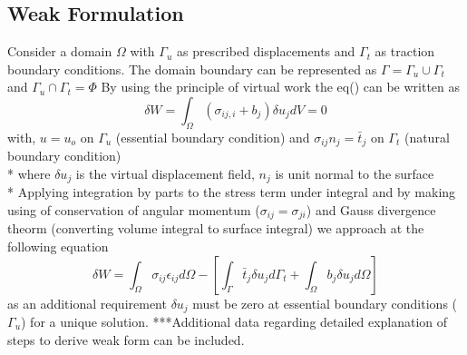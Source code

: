 \documentclass[12pt]{article}
\begin{document}
\subsection{Weak Formulation}
Consider a domain $\Omega$ with $\Gamma_u$ as prescribed displacements and $\Gamma_t$ as traction boundary conditions. The domain boundary can be represented as $\Gamma = \Gamma_u \cup \Gamma_t$ and $\Gamma_u \cap \Gamma_t = \Phi$
By using the principle of virtual work the eq() can be written as
\begin{equation}
\delta W = \int_\Omega (\sigma_{ij,i} + b_j ) \delta u_j dV = 0
\end{equation} 
with,
$u = u_o$ on $\Gamma_u$ (essential boundary condition) and
$\sigma_{ij}n_j = \bar{t}_j$ on $\Gamma_t$ (natural boundary condition) \\*
where $\delta u_j$ is the virtual displacement field, $n_j$ is unit normal to the surface \\*
Applying integration by parts to the stress term under integral and by making using of conservation of angular momentum ($ \sigma_{ij} = \sigma_{ji} $) and Gauss divergence theorm (converting volume integral to surface integral) we approach at the following equation
\begin{equation} \label{FinalWeakform}
\delta W = \int_{\Omega} \sigma_{ij} \epsilon_{ij} d\Omega - \left[ \int_{\Gamma} \bar{t}_j \delta u_j d\Gamma_t  + \int_{\Omega} b_j \delta u_j d\Omega \right]
\end{equation}
as an additional requirement $\delta u_j$ must be zero at essential boundary conditions ($\Gamma_u$) for a unique solution.
***Additional data regarding detailed explanation of steps to derive weak form can be included.
\end{document}

